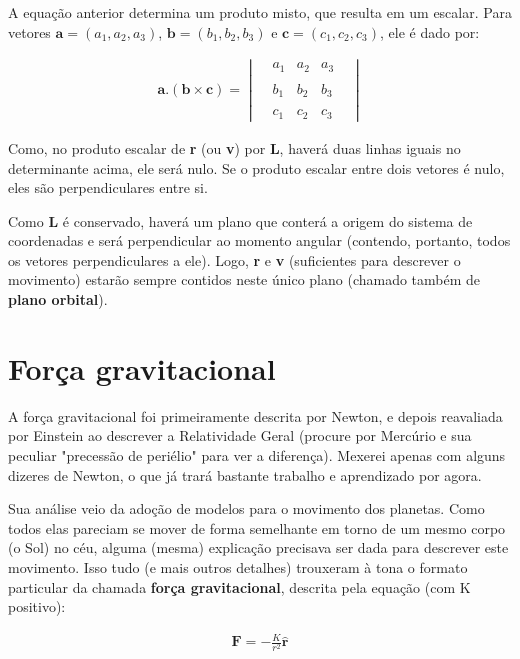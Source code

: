 A equação anterior determina um produto misto, que resulta em um escalar. Para vetores $\mathbf{a} = (a_1, a_2, a_3)$, $\mathbf{b} = (b_1, b_2, b_3)$ e $\mathbf{c} = (c_1, c_2, c_3)$, ele é dado por:

\begin{eqnarray}
	\mathbf{a . (b \times c)} = \begin{vmatrix} & a_1 & a_2 & a_3 &\\ \\&  b_1 & b_2 & b_3 &\\ \\ & c_1 & c_2 & c_3 &\end{vmatrix} \label{extra03}
\end{eqnarray} 

Como, no produto escalar de \textbf{r} (ou \textbf{v}) por \textbf{L}, haverá duas linhas iguais no determinante acima, ele será nulo. Se o produto escalar entre dois vetores é nulo, eles são perpendiculares entre si.{\\}

Como \textbf{L} é conservado, haverá  um plano que conterá a origem do sistema de coordenadas e será perpendicular ao momento angular (contendo, portanto, todos os vetores perpendiculares a ele). Logo, \textbf{r} e \textbf{v} (suficientes para descrever o movimento) estarão sempre contidos neste único plano (chamado também de \textbf{plano orbital}). 

\section{Força gravitacional}

A força gravitacional foi primeiramente descrita por Newton, e depois reavaliada por Einstein ao descrever a Relatividade Geral (procure por Mercúrio e sua peculiar "precessão de periélio" para ver a diferença). Mexerei apenas com alguns dizeres de Newton, o que já trará bastante trabalho e aprendizado por agora. {\\}

Sua análise veio da adoção de modelos para o movimento dos planetas. Como todos elas pareciam se mover de forma semelhante em torno de um mesmo corpo (o Sol) no céu, alguma (mesma) explicação precisava ser dada para descrever este movimento. Isso tudo (e mais outros detalhes) trouxeram à tona o formato particular da chamada \textbf{força gravitacional}, descrita pela equação (com K positivo):

\begin{eqnarray}
    \mathbf{F} = -\frac{K}{r^2}\mathbf{\hat{r}}    \label{eq21}
\end{eqnarray}

